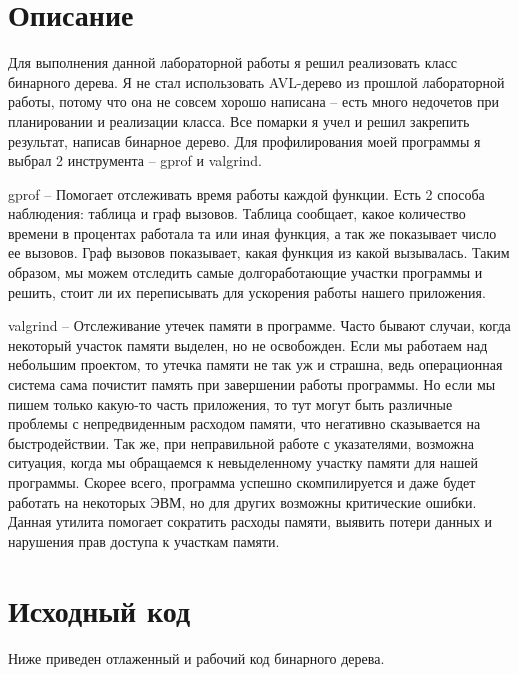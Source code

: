 \section{Описание}
Для выполнения данной лабораторной работы я решил реализовать класс бинарного дерева. Я не стал использовать AVL-дерево из прошлой лабораторной работы, потому что она не совсем хорошо написана -- есть много недочетов при планировании и реализации класса. Все помарки я учел и решил закрепить результат, написав бинарное дерево. Для профилирования моей программы я выбрал 2 инструмента -- gprof и valgrind.

gprof -- Помогает отслеживать время работы каждой функции. Есть 2 способа наблюдения: таблица и граф вызовов. Таблица сообщает, какое количество времени в процентах работала та или иная функция, а так же показывает число ее вызовов. Граф вызовов показывает, какая функция из какой вызывалась. Таким образом, мы можем отследить самые долгоработающие участки программы и решить, стоит ли их переписывать для ускорения работы нашего приложения.

valgrind -- Отслеживание утечек памяти в программе. Часто бывают случаи, когда некоторый участок памяти выделен, но не освобожден. Если мы работаем над небольшим проектом, то утечка памяти не так уж и страшна, ведь операционная система сама почистит память при завершении работы программы. Но если мы пишем только какую-то часть приложения, то тут могут быть различные проблемы с непредвиденным расходом памяти, что негативно сказывается на быстродействии. Так же, при неправильной работе с указателями, возможна ситуация, когда мы обращаемся к невыделенному участку памяти для нашей программы. Скорее всего, программа успешно скомпилируется и даже будет работать на некоторых ЭВМ, но для других возможны критические ошибки. Данная утилита помогает сократить расходы памяти, выявить потери данных и нарушения прав доступа к участкам памяти.

\pagebreak

\section{Исходный код}
Ниже приведен отлаженный и рабочий код бинарного дерева.

